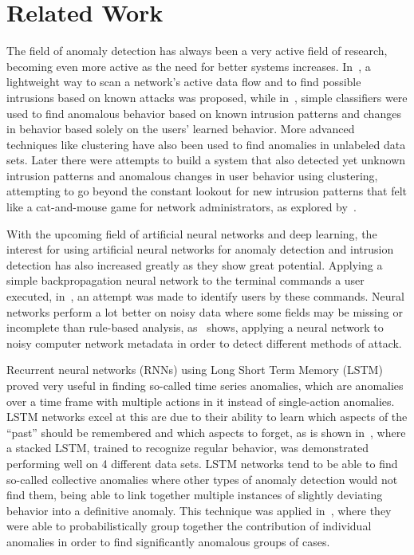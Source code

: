 \chapter{Related Work}\label{ch:related_work}

The field of anomaly detection has always been a very active field of research, becoming even more active as the need for better systems increases. In~\cite{roesch1999snort}, a lightweight way to scan a network's active data flow and to find possible intrusions based on known attacks was proposed, while in~\cite{lee1998data}, simple classifiers were used to find anomalous behavior based on known intrusion patterns and changes in behavior based solely on the users' learned behavior. More advanced techniques like clustering have also been used to find anomalies in unlabeled data sets. Later there were attempts to build a system that also detected yet unknown intrusion patterns and anomalous changes in user behavior using clustering, attempting to go beyond the constant lookout for new intrusion patterns that felt like a cat-and-mouse game for network administrators, as explored by~\cite{Portnoy01intrusiondetection}.

With the upcoming field of artificial neural networks and deep learning, the interest for using artificial neural networks for anomaly detection and intrusion detection has also increased greatly as they show great potential. Applying a simple backpropagation neural network to the terminal commands a user executed, in~\cite{ryan1998intrusion}, an attempt was made to identify users by these commands. Neural networks perform a lot better on noisy data where some fields may be missing or incomplete than rule-based analysis, as~\cite{cannady1998artificial} shows, applying a neural network to noisy computer network metadata in order to detect different methods of attack.

Recurrent neural networks (RNNs) using Long Short Term Memory (LSTM) proved very useful in finding so-called time series anomalies, which are anomalies over a time frame with multiple actions in it instead of single-action anomalies. LSTM networks excel at this are due to their ability to learn which aspects of the \enquote{past} should be remembered and which aspects to forget, as is shown in~\cite{malhotra2015long}, where a stacked LSTM, trained to recognize regular behavior, was demonstrated performing well on 4 different data sets. LSTM networks tend to be able to find so-called collective anomalies where other types of anomaly detection would not find them, being able to link together multiple instances of slightly deviating behavior into a definitive anomaly. This technique was applied in~\cite{olsson2015probabilistic}, where they were able to probabilistically group together the contribution of individual anomalies in order to find significantly anomalous groups of cases.